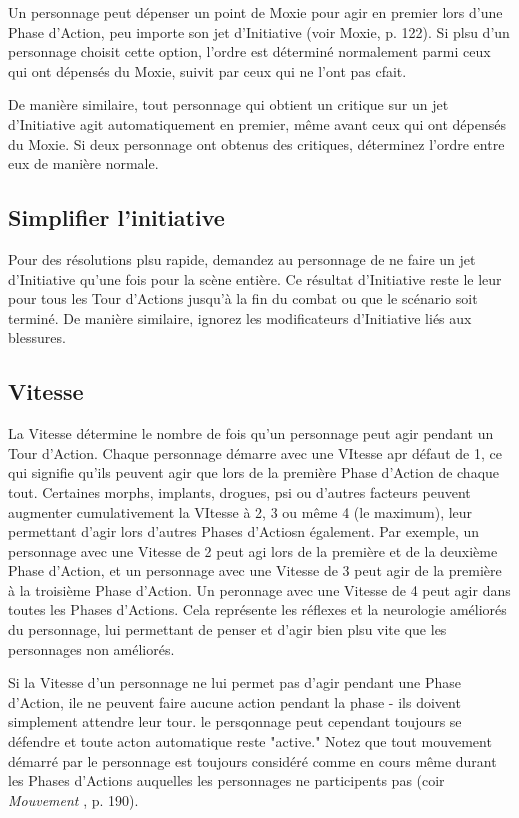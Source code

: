 Un personnage peut dépenser un point de Moxie pour agir en premier lors d'une Phase d'Action, peu importe son jet d'Initiative (voir Moxie, p. 122). Si plsu d'un personnage choisit cette option, l'ordre est déterminé normalement parmi ceux qui ont dépensés du Moxie, suivit par ceux qui ne l'ont pas cfait. 

De manière similaire, tout personnage qui obtient un critique sur un jet d'Initiative agit automatiquement en premier, même avant ceux qui ont dépensés du Moxie. Si deux personnage ont obtenus des critiques, déterminez l'ordre entre eux de manière normale. 

\subsection{Simplifier l'initiative} \label{sec:simplifying-init} 

Pour des résolutions plsu rapide, demandez au personnage de ne faire un jet d'Initiative qu'une fois pour la scène entière. Ce résultat d'Initiative reste le leur pour tous les Tour d'Actions jusqu'à la fin du combat ou que le scénario soit terminé. De manière similaire, ignorez les modificateurs d'Initiative liés aux blessures. 

\subsection{Vitesse} \label{sec:speed} 

La Vitesse détermine le nombre de fois qu'un personnage peut agir pendant un Tour d'Action. Chaque personnage démarre avec une VItesse apr défaut de 1, ce qui signifie qu'ils peuvent agir que lors de la première Phase d'Action de chaque tout. Certaines morphs, implants, drogues, psi ou d'autres facteurs peuvent augmenter cumulativement la VItesse à 2, 3 ou même 4 (le maximum), leur permettant d'agir lors d'autres Phases d'Actiosn également. Par exemple, un personnage avec une Vitesse de 2 peut agi lors de la première et de la deuxième Phase d'Action, et un personnage avec une Vitesse de 3 peut agir de la première à la troisième Phase d'Action. Un peronnage avec une Vitesse de 4 peut agir dans toutes les Phases d'Actions. Cela représente les réflexes et la neurologie améliorés du personnage, lui permettant de penser et d'agir bien plsu vite que les personnages non améliorés. 

Si la Vitesse d'un personnage ne lui permet pas d'agir pendant une Phase d'Action, ile ne peuvent faire aucune action pendant la phase - ils doivent simplement attendre leur tour. le persqonnage peut cependant toujours se défendre et toute acton automatique reste "active." Notez que tout mouvement démarré par le personnage est toujours considéré comme en cours même durant les Phases d'Actions auquelles les personnages ne participents pas (coir \emph{Mouvement }, p. 190). 



